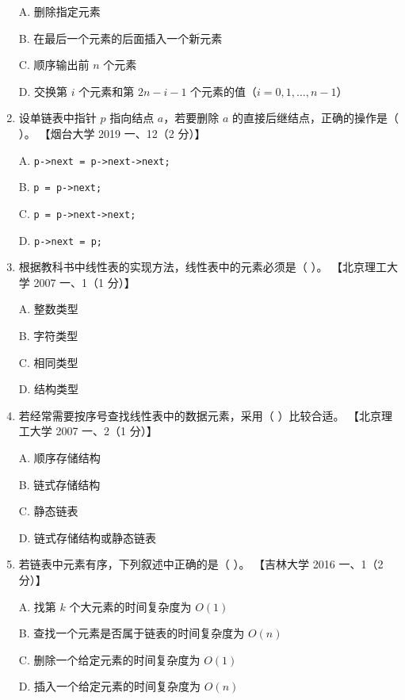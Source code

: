 \documentclass[lang=cn,newtx,10pt,scheme=chinese]{elegantbook}
\begin{document}
\begin{enumerate}
    A. 删除指定元素  

    B. 在最后一个元素的后面插入一个新元素  

    C. 顺序输出前 $n$ 个元素  

    D. 交换第 $i$ 个元素和第 $2n-i-1$ 个元素的值（$i=0, 1, \dots, n-1$）  

    \item 设单链表中指针 $p$ 指向结点 $a$，若要删除 $a$ 的直接后继结点，正确的操作是（ ）。  
    【烟台大学 2019 一、12（2 分）】  

    A. \texttt{p->next = p->next->next;}  

    B. \texttt{p = p->next;}  

    C. \texttt{p = p->next->next;}  

    D. \texttt{p->next = p;}  

    \item 根据教科书中线性表的实现方法，线性表中的元素必须是（ ）。  
    【北京理工大学 2007 一、1（1 分）】  

    A. 整数类型  

    B. 字符类型  

    C. 相同类型  

    D. 结构类型  

    \item 若经常需要按序号查找线性表中的数据元素，采用（ ）比较合适。  
    【北京理工大学 2007 一、2（1 分）】  

    A. 顺序存储结构  

    B. 链式存储结构  

    C. 静态链表  

    D. 链式存储结构或静态链表  

    \item 若链表中元素有序，下列叙述中正确的是（ ）。  
    【吉林大学 2016 一、1（2 分）】  

    A. 找第 $k$ 个大元素的时间复杂度为 $O(1)$  

    B. 查找一个元素是否属于链表的时间复杂度为 $O(n)$  

    C. 删除一个给定元素的时间复杂度为 $O(1)$  

    D. 插入一个给定元素的时间复杂度为 $O(n)$ 
\end{enumerate}
\end{document}
